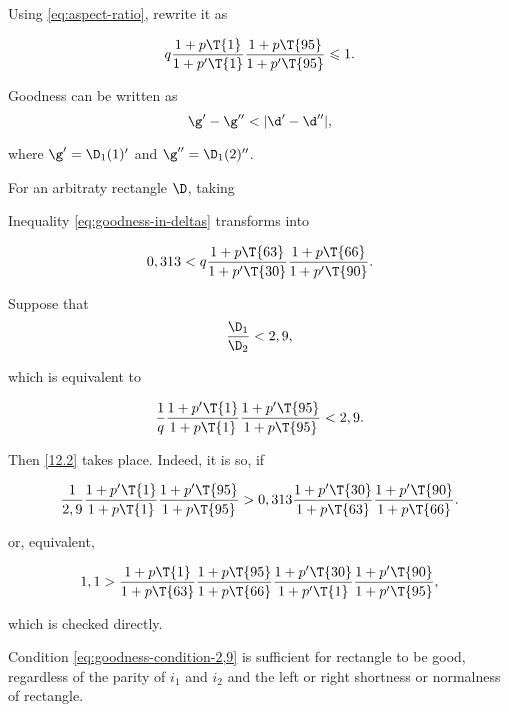 Using \ref{eq:aspect-ratio}, rewrite it as

\begin{equation*}
	q
	\dfrac{1 + p \T{1}}{1 + p' \T{1}}
	\dfrac{1 + p \T{95}}{1 + p' \T{95}} \leqslant 1.
\end{equation*}

Goodness can be written as
\begin{equation}\label{eq:goodness-in-deltas}
	\g' - \g'' < |\d' - \d''|,
\end{equation}

where $\g' = \D_1(1)'$ and $\g'' = \D_1(2)''$.

For an arbitraty rectangle $\D$, taking

Inequality \ref{eq:goodness-in-deltas} transforms into

\begin{equation}\label{12.2}
	0,313 <
	q
	\dfrac{1 + p \T{63}}{1 + p' \T{30}}
	\dfrac{1 + p \T{66}}{1 + p' \T{90}}.
\end{equation}

Suppose that
%
\begin{equation}\label{eq:goodness-condition-2,9}
	\dfrac{\D_1}{\D_2} < 2,9,
\end{equation}

which is equivalent to

\begin{equation}
	\dfrac{1}{q}
	\dfrac{1 + p' \T{1}}{1 + p \T{1}}
	\dfrac{1 + p' \T{95}}{1 + p \T{95}}
	<
	2,9.
\end{equation}

Then \ref{12.2} takes place. Indeed, it is so, if

\begin{equation*}
	\dfrac{1}{2,9}
	\dfrac{1 + p' \T{1}}{1 + p \T{1}}
	\dfrac{1 + p' \T{95}}{1 + p \T{95}}
	>
	0,313
	\dfrac{1 + p' \T{30}}{1 + p \T{63}}
	\dfrac{1 + p' \T{90}}{1 + p \T{66}}.
\end{equation*}

or, equivalent,

\begin{equation*}
	1,1
	>
	\dfrac{1 + p \T{1}}{1 + p \T{63}}
	\dfrac{1 + p \T{95}}{1 + p \T{66}}
	\dfrac{1 + p' \T{30}}{1 + p' \T{1}}
	\dfrac{1 + p' \T{90}}{1 + p' \T{95}},
\end{equation*}

which is checked directly.

Condition \ref{eq:goodness-condition-2,9} is sufficient for rectangle to be good,
regardless of the parity of $i_1$ and $i_2$ and the left or right shortness or normalness of rectangle.

